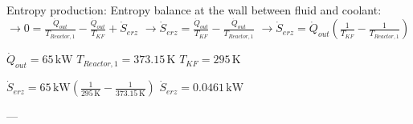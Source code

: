 Entropy production:  
Entropy balance at the wall between fluid and coolant:  
\( \rightarrow 0 = \frac{\dot{Q}_{out}}{T_{Reactor,1}} - \frac{\dot{Q}_{out}}{T_{KF}} + \dot{S}_{erz} \)  
\( \rightarrow \dot{S}_{erz} = \frac{\dot{Q}_{out}}{T_{KF}} - \frac{\dot{Q}_{out}}{T_{Reactor,1}} \)  
\( \rightarrow \dot{S}_{erz} = \dot{Q}_{out} \left( \frac{1}{T_{KF}} - \frac{1}{T_{Reactor,1}} \right) \)  

\( \dot{Q}_{out} = 65 \, \text{kW} \)  
\( T_{Reactor,1} = 373.15 \, \text{K} \)  
\( T_{KF} = 295 \, \text{K} \)  

\( \dot{S}_{erz} = 65 \, \text{kW} \left( \frac{1}{295 \, \text{K}} - \frac{1}{373.15 \, \text{K}} \right) \)  
\( \dot{S}_{erz} = 0.0461 \, \text{kW} \)  

---